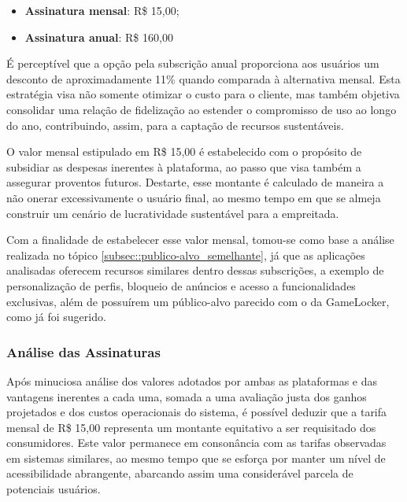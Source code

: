 \begin{itemize}
    \item \textbf{Assinatura mensal}: R\$ 15,00;
    \item \textbf{Assinatura anual}: R\$ 160,00
\end{itemize}

É perceptível que a opção pela subscrição anual proporciona aos usuários um desconto de aproximadamente 11\% quando comparada à alternativa mensal. Esta estratégia visa não somente otimizar o custo para o cliente, mas também objetiva consolidar uma relação de fidelização ao estender o compromisso de uso ao longo do ano, contribuindo, assim, para a captação de recursos sustentáveis.

O valor mensal estipulado em R\$ 15,00 é estabelecido com o propósito de subsidiar as despesas inerentes à plataforma, ao passo que visa também a assegurar proventos futuros. Destarte, esse montante é calculado de maneira a não onerar excessivamente o usuário final, ao mesmo tempo em que se almeja construir um cenário de lucratividade sustentável para a empreitada.

Com a finalidade de estabelecer esse valor mensal, tomou-se como base a análise realizada no tópico \ref{subsec::publico-alvo_semelhante}, já que as aplicações analisadas oferecem recursos similares dentro dessas subscrições, a exemplo de personalização de perfis, bloqueio de anúncios e acesso a funcionalidades exclusivas, além de possuírem um público-alvo parecido com o da GameLocker, como já foi sugerido.

\subsubsection{Análise das Assinaturas}

Após minuciosa análise dos valores adotados por ambas as plataformas e das vantagens inerentes a cada uma, somada a uma avaliação justa dos ganhos projetados e dos custos operacionais do sistema, é possível deduzir que a tarifa mensal de R\$ 15,00 representa um montante equitativo a ser requisitado dos consumidores. Este valor permanece em consonância com as tarifas observadas em sistemas similares, ao mesmo tempo que se esforça por manter um nível de acessibilidade abrangente, abarcando assim uma considerável parcela de potenciais usuários.